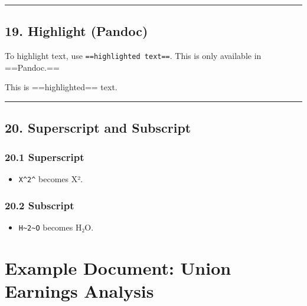 \documentclass[
]{book}
\newenvironment{Shaded}{\begin{snugshade}}{\end{snugshade}}
\newcommand{\AlertTok}[1]{\textcolor[rgb]{0.94,0.16,0.16}{#1}}
\newcommand{\NormalTok}[1]{#1}
\providecommand{\tightlist}{%
  \setlength{\itemsep}{0pt}\setlength{\parskip}{0pt}}
\theoremstyle{definition}
\theoremstyle{definition}
\theoremstyle{definition}
\theoremstyle{definition}
\theoremstyle{remark}
\begin{document}
\begin{center}\rule{0.5\linewidth}{0.5pt}\end{center}

\section{19. Highlight (Pandoc)}\label{highlight-pandoc}

To highlight text, use \texttt{==highlighted\ text==}. This is only available in ==Pandoc.==

\begin{Shaded}
\begin{Highlighting}[]
\NormalTok{This is }\AlertTok{==highlighted==}\NormalTok{ text.}
\end{Highlighting}
\end{Shaded}

\begin{center}\rule{0.5\linewidth}{0.5pt}\end{center}

\section{20. Superscript and Subscript}\label{superscript-and-subscript}

\subsection{20.1 Superscript}\label{superscript}

\begin{itemize}
\tightlist
\item
  \texttt{X\^{}2\^{}} becomes X².
\end{itemize}

\subsection{20.2 Subscript}\label{subscript}

\begin{itemize}
\tightlist
\item
  \texttt{H\textasciitilde{}2\textasciitilde{}O} becomes H₂O.
\end{itemize}

\chapter{Example Document: Union Earnings Analysis}\label{examplepaper}
\end{document}
